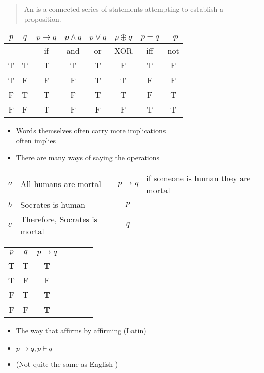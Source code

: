 \documentclass[headrule,footrule]{foils}
\begin{document}
\begin{quote}
  An  is a connected series of statements attempting to
  establish a proposition.
\end{quote}

\begin{center}
  \begin{tabular}{|c|c|c|c|c|c|c|c|}
    \hline
    $p$ & $q$ & $p \rightarrow q$ & $p \wedge q$ & $p \vee q$ 
    & $p \oplus q$ & $p \equiv q$ & $\neg p$\\
    \hline
    &   & if & and & or &  XOR & iff & not  \\
    \hline
    T & T & T & T & T & F & T & F \\ 
    T & F & F & F & T & T & F & F \\  
    F & T & T & F & T & T & F & T\\ 
    F & F & T & F & F & F & T & T\\ \hline
  \end{tabular}
  \begin{itemize}
  \item Words themselves often carry more implications
    \\  often implies 
  \item There are many ways of saying the operations
  \end{itemize}
\end{center}



\begin{center}
  \begin{tabular}{llcl}
    $a$ & All humans are mortal & $p  \rightarrow q$ & 
    \small if someone is human they are mortal\\
    $b$ & Socrates is human & $p$ \\ \hline
    $c$ & Therefore, Socrates is mortal & $q$
  \end{tabular}


  \begin{tabular}{|c|c|c|c|c|c|c|}
    \hline
    $p$ & $q$ & $p \rightarrow q$  \\
    \hline
    \rowcolor{Gray}
    \textbf{T} & T & \textbf{T}  \\ 
    \textbf{T} & F & F  \\ 
    F & T & \textbf{T}  \\ 
    F & F & \textbf{T}  \\ 
    \hline
  \end{tabular}
\end{center}
\begin{itemize}
\item  The way that affirms by affirming (Latin)
\item $p \rightarrow q, p \vdash q$
\item {}  (Not quite the same as English )
\end{itemize}
\end{document}
